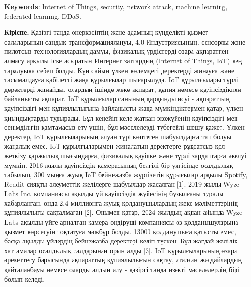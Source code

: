 {\bfseries Keywords}: Internet of Things, security, network attack,
machine learning, federated learning, DDoS.
\begin{multicols}{2}

{\bfseries Кіріспе.} Қазіргі таңда өнеркәсіптің және адамның күнделікті
қызмет салаларының сандық трансформациялануы, 4.0 Индустриясының,
сенсорлы және пилотсыз технологиялардың дамуы, физикалық үрдістерді
өзара ақпаратпен алмасу арқылы іске асыратын Интернет заттардың
(Internet of Things, IoT) кең таралуына себеп болды. Күн сайын үлкен
көлемдегі деректерді жинауға және тасымалдауға қабілетті жаңа құрылғылар
шығарылуда. IoT құрылғылары түрлі деректерді жинайды, олардың ішінде
жеке ақпарат, құпия немесе қауіпсіздікпен байланысты ақпарат. IoT
құрылғылар санының қарқынды өсуі - ақпараттың қауіпсіздігі мен
құпиялылығына байланысты жаңа мүмкіндіктермен қатар, үлкен қиындықтарды
тудырады. Бұл кеңейіп келе жатқан экожүйенің қауіпсіздігі мен
сенімділігін қамтамасыз ету үшін, бұл мәселелерді түбегейлі шешу қажет.
Үлкен деректер, IoT құрылғыларының алуан түрі көптеген шабуылдарға тап
болуы жаңалық емес. IoT құрылғыларымен жиналатын деректерге рұқсатсыз
қол жеткізу қаржылық шығындарға, физикалық қауіпке және түрлі
зардаптарға әкелуі мүмкін. 2016 жылы қауіпсіздік камерасының белгілі бір
үлгісінде осалдылық табылып, 300 мыңға жуық IoT бейнежазба жүргізетін
құрығылар арқылы Spotify, Reddit сияқты әлеуметтік желілерге шабуылдар
жасалған {[}1{]}. 2019 жылы Wyze Labs Inc. компаниясы ақылды үй
қауіпсіздік жүйесінің бұзылғаны туралы хабарланған, онда 2,4 миллионға
жуық қолданушылардың жеке мәліметтерінің құпиялылығы сақталмаған
{[}2{]}. Онымен қатар, 2024 жылдың ақпан айында Wyze Labs ақылды үйге
арналған камера өндіруші компаниясы өз қолданышуларына қызмет көрсетуін
тоқтатуға мәжбүр болды. 13000 қолданушыға қатысты емес, басқа ақылды
үйлердің бейнежазба деректері келіп түскен. Бұл жағдай желілік
хаттамалар осалдылық салдарынан орын алды {[}3{]}. IoT құрылғыларының
өзара әрекеттесу барысында ақпараттың құпиялылығын сақтау, аталған
жағдайлардың қайталанбауы немесе оларды алдын алу - қазіргі таңда өзекті
мәселелердің бірі болып келеді.


\end{multicols}
